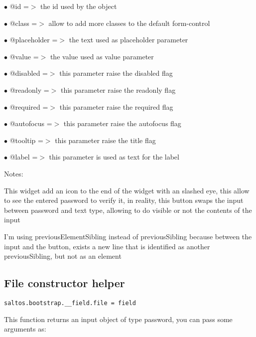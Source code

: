 \documentclass[a4paper]{book}
\begin{document}
\begin{compactitem}
\item[\color{myblue}$\bullet$] @id          =$>$ the id used by the object
\item[\color{myblue}$\bullet$] @class       =$>$ allow to add more classes to the default form-control
\item[\color{myblue}$\bullet$] @placeholder =$>$ the text used as placeholder parameter
\item[\color{myblue}$\bullet$] @value       =$>$ the value used as value parameter
\item[\color{myblue}$\bullet$] @disabled    =$>$ this parameter raise the disabled flag
\item[\color{myblue}$\bullet$] @readonly    =$>$ this parameter raise the readonly flag
\item[\color{myblue}$\bullet$] @required    =$>$ this parameter raise the required flag
\item[\color{myblue}$\bullet$] @autofocus   =$>$ this parameter raise the autofocus flag
\item[\color{myblue}$\bullet$] @tooltip     =$>$ this parameter raise the title flag
\item[\color{myblue}$\bullet$] @label       =$>$ this parameter is used as text for the label
\end{compactitem}

Notes:

This widget add an icon to the end of the widget with an slashed eye, this allow to
see the entered password to verify it, in reality, this button swaps the input between
password and text type, allowing to do visible or not the contents of the input

I'm using previousElementSibling instead of previousSibling because between the input and the
button, exists a new line that is identified as another previousSibling, but not as an element

\hypertarget{toc453}{}
\subsection{File constructor helper}

\begin{lstlisting}
saltos.bootstrap.__field.file = field
\end{lstlisting}

This function returns an input object of type password, you can pass some arguments as:
\end{document}
